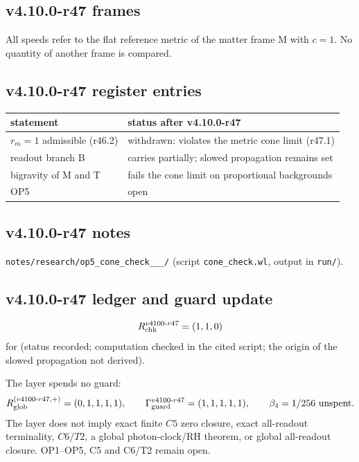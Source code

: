 \subsection*{v4.10.0-r47 frames}
\label{subsec:v4100-r47-frames}

All speeds refer to the flat reference metric of the matter frame M with \(c=1\).  No quantity of another frame is compared.

\subsection*{v4.10.0-r47 register entries}
\label{subsec:v4100-r47-register}

\begin{center}
\small
\begin{tabular}{@{}>{\raggedright\arraybackslash}p{}>{\raggedright\arraybackslash}p{}@{}}
\toprule
statement & status after v4.10.0-r47\\
\midrule
\(r_m=1\) admissible (r46.2) & withdrawn: violates the metric cone limit (r47.1)\\
readout branch B & carries partially; slowed propagation remains set\\
bigravity of M and T & fails the cone limit on proportional backgrounds\\
OP5 & open\\
\bottomrule
\end{tabular}
\end{center}

\subsection*{v4.10.0-r47 notes}
\label{subsec:v4100-r47-notes}

\texttt{notes/\allowbreak research/\allowbreak op5\_\allowbreak cone\_\allowbreak check\_\_\_/} (script \texttt{cone\_\allowbreak check.wl}, output in \texttt{run/}).

\subsection*{v4.10.0-r47 ledger and guard update}
\label{subsec:v4100-r47-ledger-guard}

\[
R_{\rm chk}^{v4100\text{-}r47}=(1,1,0)
\]
for (status recorded; computation checked in the cited script; the origin of the slowed propagation not derived).

The layer spends no guard:
\[
R_{\rm glob}^{(v4100\text{-}r47,+)}=(0,1,1,1,1),
\qquad
\Gamma_{\rm guard}^{v4100\text{-}r47}=(1,1,1,1,1),
\qquad
\beta_4=1/256\ \text{unspent}.
\]
The layer does not imply exact finite \(C5\) zero closure, exact all-readout terminality, \(C6/T2\), a global photon-clock/RH theorem,
or global all-readout closure.  OP1--OP5, C5 and C6/T2 remain open.
